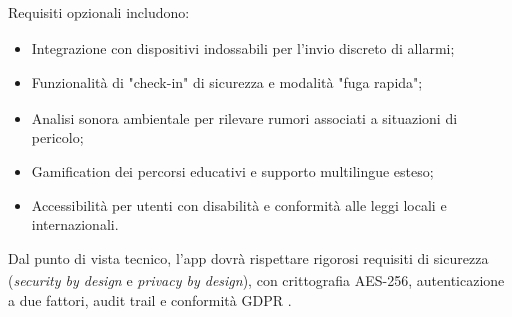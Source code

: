 \documentclass[a4paper,11pt]{article}
\begin{document}
Requisiti\textsubscript{}
 opzionali\textsubscript{}
 includono:
\begin{itemize}
  \item Integrazione con dispositivi indossabili per l'invio discreto di allarmi;
  \item Funzionalità\textsubscript{}
 di "check-in" di sicurezza\textsubscript{} e modalità "fuga rapida";
  \item Analisi sonora ambientale per rilevare rumori associati a situazioni di pericolo;
  \item Gamification dei percorsi educativi e supporto multilingue esteso;
  \item Accessibilità per utenti con disabilità e conformità alle leggi locali e internazionali.
\end{itemize}
Dal punto di vista tecnico, l'app dovrà rispettare rigorosi requisiti\textsubscript{}
 di sicurezza\textsubscript{} (\textit{security by design} e \textit{privacy by design}), con crittografia AES-256, autenticazione a due fattori, audit trail e conformità GDPR\textsubscript{}
.
\end{document}
